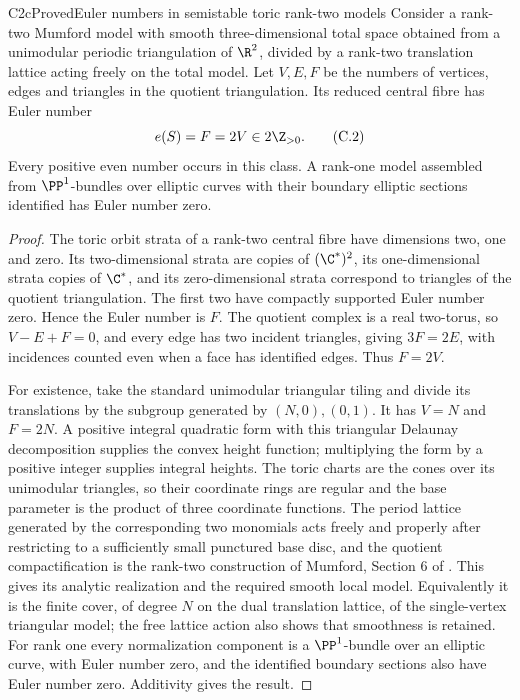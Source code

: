 \begin{statement}{C2c}{Proved}{Euler numbers in semistable toric rank-two models}
Consider a rank-two Mumford model with smooth three-dimensional total space obtained from a unimodular periodic triangulation of $\R^2$, divided by a rank-two translation lattice acting freely on the total model. Let $V,E,F$ be the numbers of vertices, edges and triangles in the quotient triangulation. Its reduced central fibre has Euler number
\[
 e(S)=F=2V\in2\Z_{>0}.                                \tag{C.2}
\]
Every positive even number occurs in this class. A rank-one model assembled from $\PP^1$-bundles over elliptic curves with their boundary elliptic sections identified has Euler number zero.
\end{statement}
\begin{proof}
The toric orbit strata of a rank-two central fibre have dimensions two, one and zero. Its two-dimensional strata are copies of $(\C^*)^2$, its one-dimensional strata copies of $\C^*$, and its zero-dimensional strata correspond to triangles of the quotient triangulation. The first two have compactly supported Euler number zero. Hence the Euler number is $F$. The quotient complex is a real two-torus, so $V-E+F=0$, and every edge has two incident triangles, giving $3F=2E$, with incidences counted even when a face has identified edges. Thus $F=2V$.

For existence, take the standard unimodular triangular tiling and divide its translations by the subgroup generated by $(N,0),(0,1)$. It has $V=N$ and $F=2N$. A positive integral quadratic form with this triangular Delaunay decomposition supplies the convex height function; multiplying the form by a positive integer supplies integral heights. The toric charts are the cones over its unimodular triangles, so their coordinate rings are regular and the base parameter is the product of three coordinate functions. The period lattice generated by the corresponding two monomials acts freely and properly after restricting to a sufficiently small punctured base disc, and the quotient compactification is the rank-two construction of Mumford, Section 6 of \cite{Mumford1972}. This gives its analytic realization and the required smooth local model. Equivalently it is the finite cover, of degree $N$ on the dual translation lattice, of the single-vertex triangular model; the free lattice action also shows that smoothness is retained. For rank one every normalization component is a $\PP^1$-bundle over an elliptic curve, with Euler number zero, and the identified boundary sections also have Euler number zero. Additivity gives the result.
\end{proof}

